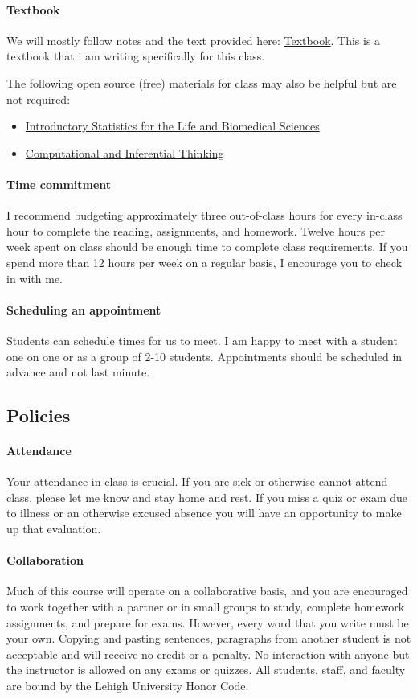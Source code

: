 \documentclass[11pt]{article}
\newcommand{\sub}[1]{
\hrulefill
\vspace{-5mm}
\subsection*{#1}
\vspace{-5mm}
\hrulefill
\vspace{-2.5mm}
}
\begin{document}
\paragraph{Textbook}

We will mostly follow notes and the text provided here:
\href{https://github.com/tomcm39/2022S-BSTA001-Textbook/blob/main/phds.pdf}{Textbook}.
This is a textbook that i am writing specifically for this class.

The following open source (free) materials for class may also be helpful but are not required:
\begin{itemize}
   \item \href{https://www.openintro.org/go/?id=biostat0&referrer=/book/biostat/index.php}{Introductory Statistics for the Life and Biomedical Sciences}
   \item \href{https://www.inferentialthinking.com/chapters/intro.html}{Computational and Inferential Thinking}
\end{itemize} 

\paragraph{Time commitment}

I recommend budgeting approximately three out-of-class hours for every in-class hour to complete the reading, assignments, and homework.
Twelve hours per week spent on class should be enough time to complete class requirements.  
If you spend more than 12 hours per week on a regular basis, I encourage you to check in with me.

\paragraph{Scheduling an appointment}
Students can schedule times for us to meet.
I am happy to meet with a student one on one or as a group of 2-10 students.
Appointments should be scheduled in advance and not last minute.


\sub{Policies}
\paragraph{Attendance}
Your attendance in class is crucial.
If you are sick or otherwise cannot attend class, please let me know and stay home and rest.
If you miss a quiz or exam due to illness or an otherwise excused absence you will have an opportunity to make up that evaluation.


\paragraph{Collaboration}
Much of this course will operate on a collaborative basis, and you are encouraged to work together with a partner or in small groups to study, complete homework assignments, and prepare for exams.
However, every word that you write must be your own.
Copying and pasting sentences, paragraphs from another student is not acceptable and will receive no credit or a penalty.
No interaction with anyone but the instructor is allowed on any exams or quizzes.
All students, staff, and faculty are bound by the Lehigh University Honor Code.\\
\end{document}

